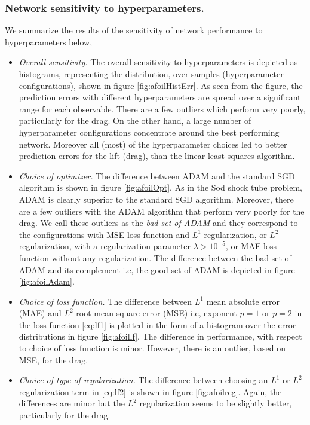 \documentclass[a4paper]{article}
\numberwithin{equation}{section}
\numberwithin{equation}{section}
\theoremstyle{definition}
\theoremstyle{myremarkstyle}
\begin{document}
\subsubsection{Network sensitivity to hyperparameters.}
We summarize the results of the sensitivity of network performance to hyperparameters below,
\begin{itemize}
\item \emph{Overall sensitivity.} The overall sensitivity to hyperparameters is depicted as histograms, representing the distribution, over samples (hyperparameter configurations), shown in
figure \ref{fig:afoilHistErr}. As seen from the figure, the prediction errors with different hyperparameters are spread over a significant range for each observable. There are a few outliers which perform very poorly, particularly for the drag. On the other hand,  a large number of  hyperparameter configurations concentrate around the best performing network. Moreover all (most) of the hyperparameter choices led to better prediction errors for the lift (drag), than the linear least squares algorithm.  
\item \emph{Choice of optimizer.} The difference between ADAM and the standard SGD algorithm is shown in figure \ref{fig:afoilOpt}. As in the Sod shock tube problem, ADAM is clearly superior to the standard SGD algorithm. Moreover, there are a few outliers with the ADAM algorithm that perform very poorly for the drag. We call these outliers as the \emph{bad set of ADAM} and they correspond to the configurations with MSE loss function and $L^1$ regularization, or $L^2$ regularization, with a regularization parameter $\lambda > 10^{-5}$, or MAE loss function without any regularization. The difference between the bad set of ADAM and its complement i.e, the good set of ADAM is depicted in figure \ref{fig:afoilAdam}. 
\item \emph{Choice of loss function.} The difference between $L^1$ mean absolute error (MAE) and $L^2$ root mean square error (MSE) i.e, exponent $p=1$ or $p=2$ in the loss function \eqref{eq:lf1} is plotted in the form of a histogram over the error distributions in figure \ref{fig:afoillf}. The difference in performance, with respect to choice of loss function is minor. However, there is an outlier, based on MSE, for the drag.
\item \emph{Choice of type of regularization.} The difference between choosing an $L^1$ or $L^2$ regularization term in \eqref{eq:lf2} is shown in figure \ref{fig:afoilreg}. Again, the differences are minor but the $L^2$ regularization seems to be slightly better, particularly for the drag. 

\end{itemize}
\end{document}
